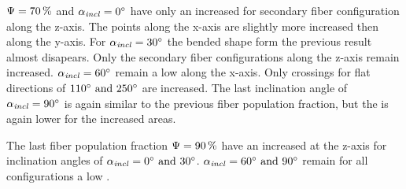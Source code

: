 \par
%
$\textnormal{$\Psi$}=\SI{70}{\percent}$ and $\textnormal{$\alpha_{\mathit{incl}}$}=\SI{0}{\degree}$ have only an increased \rvalue{} for secondary fiber configuration along the z-axis.
The points along the x-axis are slightly more increased then along the y-axis.
For $\textnormal{$\alpha_{\mathit{incl}}$}=\SI{30}{\degree}$ the bended shape form the previous result almost disapears.
Only the secondary fiber configurations along the z-axis remain increased.
$\textnormal{$\alpha_{\mathit{incl}}$}=\SI{60}{\degree}$ remain a low \rvalue{} along the x-axis.
Only crossings for flat directions of $\SIlist{110;250}{\degree}$ are increased.
The last inclination angle of $\textnormal{$\alpha_{\mathit{incl}}$}=\SI{90}{\degree}$ is again similar to the previous fiber population fraction, but the \rvalue{} is again lower for the increased areas.
\par
% 
The last fiber population fraction $\textnormal{$\Psi$}=\SI{90}{\percent}$ have an increased \rvalue{} at the z-axis for inclination angles of $\modelInc=\SIlist{0;30}{\degree}$.
$\modelInc=\SIlist{60;90}{\degree}$ remain for all configurations a low \rvalue{}.
% 
% 
% 
